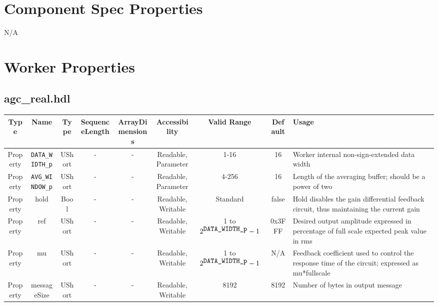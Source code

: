 \documentclass{article}
\def\comp{agc\_real}
\begin{document}
\begin{landscape}
	\section*{Component Spec Properties}
		N/A

	\section*{Worker Properties}
	\subsection*{\comp.hdl}
	\begin{scriptsize}
		\begin{tabular}{|c|c|c|c|c|c|c|c|p{6.9cm}|}
			\hline
			\rowcolor{blue}
			Type     & Name                & Type   & SequenceLength & ArrayDimensions & Accessibility       & Valid Range & Default & Usage                                        \\
			\hline
			Property & \verb+DATA_WIDTH_p+ & UShort & -              & -               & Readable, Parameter & 1-16        & 16      & Worker internal non-sign-extended data width \\
			\hline
			Property & \verb+AVG_WINDOW_p+ & UShort & -              & -               & Readable, Parameter & 4-256       & 16      & Length of the averaging buffer; should be a power of two \\
			\hline
			Property & hold                & Bool   & -              & -               & Readable, Writable  & Standard    & false   & Hold disables the gain differential feedback circuit, thus maintaining the current gain \\
			\hline
			Property & ref                 & UShort & -              & -               & Readable, Writable  & 1 to $2^{\verb+DATA_WIDTH_p+}-1$ & 0x3FFF & Desired output amplitude expressed in percentage of full scale expected peak value in rms \\
			\hline
			Property & mu                  & UShort & -              & -               & Readable, Writable  & 1 to $2^{\verb+DATA_WIDTH_p+}-1$ & N/A & Feedback coefficient used to control the response time of the circuit; expressed as mu*fullscale \\
			\hline
			Property & messageSize         & UShort & -              & -               & Readable, Writable  & 8192        & 8192    & Number of bytes in output message                            \\
			\hline
		\end{tabular}
	\end{scriptsize}


\end{landscape}
\end{document}
